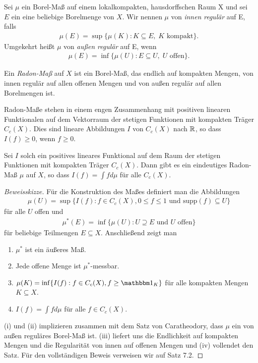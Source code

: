 	Sei $\mu$ ein Borel-Maß auf einem lokalkompakten, hausdorffschen Raum X und sei $E$ ein eine beliebige Borelmenge von $X$.
	Wir nennen $\mu$ von \emph{innen regulär} auf E, falls
	\begin{align*}
		\mu(E) = \sup\{\mu(K): K \subseteq E,\; K \text{ kompakt}\}.
	\end{align*}
	Umgekehrt heißt $\mu$ von \emph{außen regulär} auf E, wenn
	\begin{align*}
		\mu(E) = \inf\{\mu(U): E \subseteq U,\; U \text{ offen}\}.
	\end{align*}
	
	\begin{defi}
		Ein \emph{Radon-Maß} auf $X$ ist ein Borel-Maß, das endlich auf kompakten Mengen, von innen regulär auf allen offenen Mengen und von außen regulär auf allen Borelmengen ist.
	\end{defi}
	Radon-Maße stehen in einem engen Zusammenhang mit positiven linearen Funktionalen auf dem Vektorraum der stetigen Funktionen mit kompakten Träger $C_c(X)$.
	Dies sind lineare Abbildungen $I$ von $C_c(X)$ nach $\mathbb{R}$, so dass $I(f) \geq 0$, wenn $f\geq 0$.
	\begin{satz}
		Sei $I$ solch ein positives lineares Funktional auf dem Raum der stetigen Funktionen mit kompakten Träger $C_c(X)$.
		Dann gibt es ein eindeutiges Radon-Maß $\mu$ auf $X$, so dass $I(f) = \int f d\mu$ für alle $C_c(X)$.
	\end{satz}
	\begin{proof}[Beweisskizze]
		Für die Konstruktion des Maßes definiert man die Abbildungen
		\begin{align*}
			\mu(U) = \sup\{I(f): f\in C_c(X), 0\leq f\leq 1 \text{ und } \text{supp}(f) \subseteq U\}
		\end{align*}
		für alle $U$ offen und
		\begin{align*}
			\mu^*(E) = \inf \{ \mu(U): U\supseteq E \text{ und } U \text{ offen}\}
		\end{align*}
		für beliebige Teilmengen $E\subseteq X$. 
		Anschließend zeigt man
		\begin{enumerate}[label=(\roman*)]
			\item $\mu^*$ ist ein äußeres Maß.
			\item Jede offene Menge ist $\mu^*$-messbar.
			\item $\mu(K) = \inf\{I(f): f\in C_c(X), f\geq \ind_K\}$ für alle kompakten Mengen $K \subseteq X$.
			\item $I(f) = \int f d\mu$ für alle $f\in C_c(X)$.
		\end{enumerate}
		(i) und (ii) implizieren zusammen mit dem Satz von Caratheodory, dass $\mu$ ein von außen reguläres Borel-Maß ist.
		(iii) liefert uns die Endlichkeit auf kompakten Mengen und die Regularität von innen auf offenen Mengen und (iv) vollendet den Satz.
		Für den vollständigen Beweis verweisen wir auf \textcite{folland} Satz 7.2.
	\end{proof}
